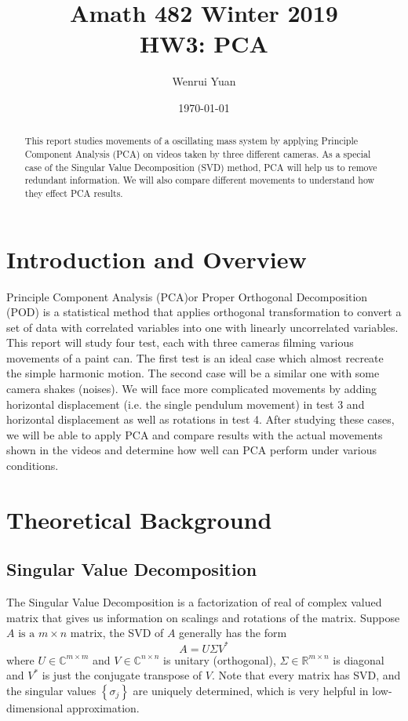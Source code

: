\documentclass[11pt,a4paper]{article}
\title{Amath 482 Winter 2019 \\
HW3: PCA}
\author{Wenrui Yuan}
\date{\today}
\numberwithin{equation}{subsection}
\begin{document}
\maketitle

\begin{abstract}
	This report studies movements of a oscillating mass system by applying Principle Component Analysis (PCA) on videos taken by three different cameras. As a special case of the Singular Value Decomposition (SVD) method, PCA will help us to remove redundant information. We will also compare different movements to understand how they effect PCA results.
\end{abstract}


\section{Introduction and Overview}
	Principle Component Analysis (PCA)or Proper Orthogonal Decomposition (POD) is a statistical method that applies orthogonal transformation to convert a set of data with correlated variables into one with linearly uncorrelated variables.\cite{pca}\\
	This report will study four test, each with three cameras filming various movements of a paint can. The first test is an ideal case which almost recreate the simple harmonic motion. The second case will be a similar one with some camera shakes (noises). We will face more complicated movements by adding horizontal displacement (i.e. the single pendulum movement) in test 3 and horizontal displacement as well as rotations in test 4. After studying these cases, we will be able to apply PCA and compare results with the actual movements shown in the videos and determine how well can PCA perform under various conditions.


\section{Theoretical Background}
\subsection{Singular Value Decomposition}
The Singular Value Decomposition is a factorization of real of complex valued matrix that gives us information on scalings and rotations of the matrix. Suppose $A \text{ is a } m\times n \text{ matrix}$, the SVD of $A$ generally has the form \cite{svd}
\begin{equation}
A=U\Sigma V^*
\end{equation}
where $U\in \mathbb{C}^{m\times m}$ and $V\in \mathbb{C}^{n\times n}$ is unitary (orthogonal), $\Sigma\in \mathbb{R}^{m\times n}$ is diagonal and $V^*$ is just the conjugate transpose of $V$. Note that every matrix has SVD, and the singular values $\left\{ \sigma_{j}\right\}$ are uniquely determined, which is very helpful in low-dimensional approximation\cite{582}.
\end{document}
